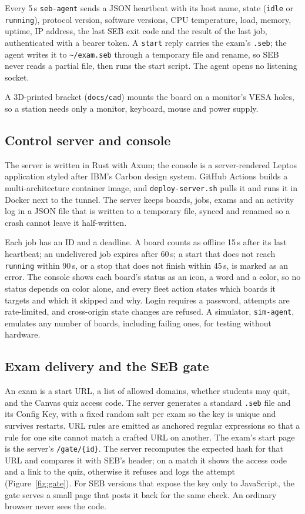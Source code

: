 \documentclass[11pt]{article}
\begin{document}
Every 5\,s \texttt{seb-agent} sends a JSON heartbeat with its host name, state (\texttt{idle} or \texttt{running}), protocol version, software versions, CPU temperature, load, memory, uptime, IP address, the last SEB exit code and the result of the last job, authenticated with a bearer token. A \texttt{start} reply carries the exam's \texttt{.seb}; the agent writes it to \texttt{\textasciitilde/exam.seb} through a temporary file and rename, so SEB never reads a partial file, then runs the start script. The agent opens no listening socket.

A 3D-printed bracket (\texttt{docs/cad}) mounts the board on a monitor's VESA holes, so a station needs only a monitor, keyboard, mouse and power supply.

\subsection{Control server and console}
The server is written in Rust with Axum; the console is a server-rendered Leptos application styled after IBM's Carbon design system. GitHub Actions builds a multi-architecture container image, and \texttt{deploy-server.sh} pulls it and runs it in Docker next to the tunnel. The server keeps boards, jobs, exams and an activity log in a JSON file that is written to a temporary file, synced and renamed so a crash cannot leave it half-written.

Each job has an ID and a deadline. A board counts as offline 15\,s after its last heartbeat; an undelivered job expires after 60\,s; a start that does not reach \texttt{running} within 90\,s, or a stop that does not finish within 45\,s, is marked as an error. The console shows each board's status as an icon, a word and a color, so no status depends on color alone, and every fleet action states which boards it targets and which it skipped and why. Login requires a password, attempts are rate-limited, and cross-origin state changes are refused. A simulator, \texttt{sim-agent}, emulates any number of boards, including failing ones, for testing without hardware.

\subsection{Exam delivery and the SEB gate}
\label{sec:gate}
An exam is a start URL, a list of allowed domains, whether students may quit, and the Canvas quiz access code. The server generates a standard \texttt{.seb} file and its Config Key, with a fixed random salt per exam so the key is unique and survives restarts. URL rules are emitted as anchored regular expressions so that a rule for one site cannot match a crafted URL on another. The exam's start page is the server's \texttt{/gate/\{id\}}. The server recomputes the expected hash for that URL and compares it with SEB's header; on a match it shows the access code and a link to the quiz, otherwise it refuses and logs the attempt (Figure~\ref{fig:gate}). For SEB versions that expose the key only to JavaScript, the gate serves a small page that posts it back for the same check. An ordinary browser never sees the code.
\end{document}
